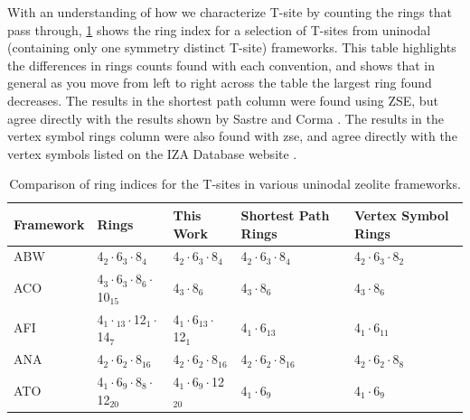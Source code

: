 \documentclass[preprint,numrefs,noinfo,sort&compress]{elsarticle}
\begin{document}
With an understanding of how we characterize T-site by counting the rings that pass through, \cref{tab:uninodal} shows the ring index for a selection of T-sites from uninodal (containing only one symmetry distinct T-site) frameworks. This table highlights the differences in rings counts found with each convention, and shows that in general as you move from left to right across the table the largest ring found decreases. The results in the shortest path column were found using ZSE, but agree directly with the results shown by Sastre and Corma \cite{sastre-topological-2009}. The results in the vertex symbol rings column were also found with zse, and agree directly with the vertex symbols listed on the IZA Database website \cite{baerlocher-database-nodate}.  

\begin{table}
\centering
\begin{threeparttable}
\caption{Comparison of ring indices for the T-sites in various uninodal zeolite frameworks. \label{tab:uninodal}}
{\scriptsize
\begin{tabular}{lllll}
\hline
Framework & Rings & This Work & Shortest Path Rings \cite{sastre-topological-2009} & Vertex Symbol Rings \cite{baerlocher-database-nodate}\\
\hline
ABW & 4\(_{\text{2}} \cdot\)6\(_{\text{3}} \cdot\)8\(_{\text{4}}\) & 4\(_{\text{2}} \cdot\)6\(_{\text{3}} \cdot\)8\(_{\text{4}}\) & 4\(_{\text{2}} \cdot\)6\(_{\text{3}} \cdot\)8\(_{\text{4}}\) & 4\(_{\text{2}} \cdot\)6\(_{\text{3}} \cdot\)8\(_{\text{2}}\)\\
ACO & 4\(_{\text{3}} \cdot\)6\(_{\text{3}} \cdot\)8\(_{\text{6}} \cdot\)10\(_{\text{15}}\) & 4\(_{\text{3}} \cdot\)8\(_{\text{6}}\) & 4\(_{\text{3}} \cdot\)8\(_{\text{6}}\) & 4\(_{\text{3}} \cdot\)8\(_{\text{6}}\)\\
AFI & 4\(_{\text{1}} \cdot\)\(_{\text{13}} \cdot\)12\(_{\text{1}} \cdot\)14\(_{\text{7}}\) & 4\(_{\text{1}} \cdot\)6\(_{\text{13}} \cdot\)12\(_{\text{1}}\) & 4\(_{\text{1}} \cdot\)6\(_{\text{13}}\) & 4\(_{\text{1}} \cdot\)6\(_{\text{11}}\)\\
ANA & 4\(_{\text{2}} \cdot\)6\(_{\text{2}} \cdot\)8\(_{\text{16}}\) & 4\(_{\text{2}} \cdot\)6\(_{\text{2}} \cdot\)8\(_{\text{16}}\) & 4\(_{\text{2}} \cdot\)6\(_{\text{2}} \cdot\)8\(_{\text{16}}\) & 4\(_{\text{2}} \cdot\)6\(_{\text{2}} \cdot\)8\(_{\text{8}}\)\\
ATO & 4\(_{\text{1}} \cdot\)6\(_{\text{9}} \cdot\)8\(_{\text{8}} \cdot\)12\(_{\text{20}}\) & 4\(_{\text{1}} \cdot\)6\(_{\text{9}} \cdot\)12\(_{\text{20}}\) & 4\(_{\text{1}} \cdot\)6\(_{\text{9}}\) & 4\(_{\text{1}} \cdot\)6\(_{\text{9}}\)\\

\end{tabular}}
\end{threeparttable}
\end{table}
\end{document}
